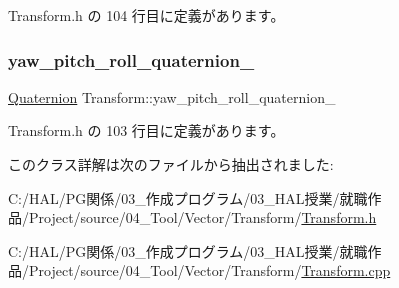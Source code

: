  Transform.\+h の 104 行目に定義があります。

\mbox{\label{class_transform_ac9985a4b70b9af742c9f26f47784ba7b}} 
\subsubsection{\texorpdfstring{yaw\+\_\+pitch\+\_\+roll\+\_\+quaternion\+\_\+}{yaw\_pitch\_roll\_quaternion\_}}
{\footnotesize\ttfamily \mbox{\hyperlink{_vector3_d_8h_a3ee38c9c46d9851e33a9a1113328dafc}{Quaternion}} Transform\+::yaw\+\_\+pitch\+\_\+roll\+\_\+quaternion\+\_\+\hspace{0.3cm}{\ttfamily [private]}}



 Transform.\+h の 103 行目に定義があります。



このクラス詳解は次のファイルから抽出されました\+:\begin{DoxyCompactItemize}
\item 
C\+:/\+H\+A\+L/\+P\+G関係/03\+\_\+作成プログラム/03\+\_\+\+H\+A\+L授業/就職作品/\+Project/source/04\+\_\+\+Tool/\+Vector/\+Transform/\mbox{\hyperlink{_transform_8h}{Transform.\+h}}\item 
C\+:/\+H\+A\+L/\+P\+G関係/03\+\_\+作成プログラム/03\+\_\+\+H\+A\+L授業/就職作品/\+Project/source/04\+\_\+\+Tool/\+Vector/\+Transform/\mbox{\hyperlink{_transform_8cpp}{Transform.\+cpp}}\end{DoxyCompactItemize}
